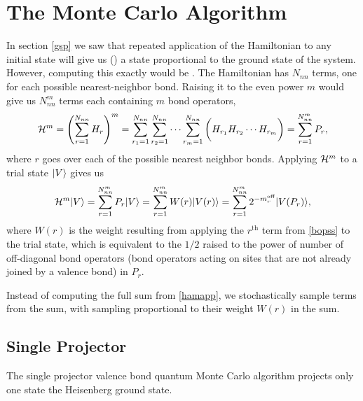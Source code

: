 \section{The Monte Carlo Algorithm}
In section \ref{gsp} we saw that repeated application of the Hamiltonian to any initial state will
give us () a state proportional to the
ground state of the system.
However, computing this exactly would be .
The Hamiltonian has $N_{nn}$ terms, one for each possible nearest-neighbor bond.  
Raising it to the even power $m$ would give us $N_{nn}^m$ terms each containing $m$ bond operators,
\begin{equation} \label{bopss}  
	\mathcal{H}^m=\left(\sum_{r=1}^{N_{nn}}H_r\right)^m=
	\sum_{r_1=1}^{N_{nn}}\sum_{r_2=1}^{N_{nn}}\cdots \sum_{r_m=1}^{N_{nn}}
	\bigg( H_{r_1} H_{r_2} \cdots H_{r_m} \bigg) 
	=\sum_{r=1}^{N_{nn}^m} P_r,
\end{equation}
where $r$ goes over each of the possible nearest neighbor bonds.  
Applying $\mathcal{H}^m$ to a trial state $\lvert {V} \rangle$ gives us
\begin{equation} \label{hamapp}
	\mathcal{H}^m \lvert {V} \rangle = \sum_{r=1}^{N_{nn}^m} P_r \lvert {V} \rangle = \sum_{r=1}^{N_{nn}^m} W(r)\lvert {V(r)} \rangle
	= \sum_{r=1}^{N_{nn}^m} 2^{-m_r^{\text{off}}}\lvert {V(P_r)} \rangle,
\end{equation}
where $W(r)$ is the weight resulting from applying the $r^{\text{th}}$ term from \eqref{bopss} to 
the trial state, which is equivalent to the $1/2$ raised to the power of number of
 off-diagonal bond operators (bond operators
acting on sites that are not already joined by a valence bond) in $P_r$.

Instead of computing the full sum from \eqref{hamapp}, we stochastically sample terms
from the sum, with sampling proportional to their weight $W(r)$ in the sum.


\subsection{Single Projector}
The single projector valence bond quantum Monte Carlo algorithm projects only one state 
the Heisenberg ground state.

